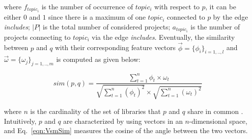 \noindent
where $f_{topic_{i}}$ is the number of occurrence of $topic_{i}$ with respect to $p$, it can be either $0$ and $1$ since there is a maximum of one $topic_{i}$ connected to $p$ by the edge \emph{includes}; $\left | P \right |$ is the total number of considered projects; $a_{topic_{i}}$ is the number of projects connecting to $topic_{i}$ via the edge \emph{includes}. %
Eventually, the similarity between $p$ and $q$ with their corresponding feature vectors $\overrightarrow{\phi}=\{\phi_{i}\}_{i=1,..,l}$ and $\overrightarrow{\omega}=\{\omega_{j}\}_{j=1,..,m}$ is computed as given below:%

\begin{equation} \label{eqn:VsmSim}
sim(p,q)=\frac{\sum_{t=1}^{n}\phi_{t}\times \omega_{t}}{\sqrt{\sum_{t=1}^{n}(\phi_{t})^{2} }\times \sqrt{\sum_{t=1}^{n}(\omega_{t})^{2}}} 
\end{equation}

where $n$ is the cardinality of the set of libraries that $p$ and $q$ share in common \cite{DiNoia:2012:LOD:2362499.2362501}. Intuitively, $p$ and $q$ are characterized by using vectors in an $n$-dimensional space, and Eq.~\ref{eqn:VsmSim} measures the cosine of the angle between the two vectors. %







